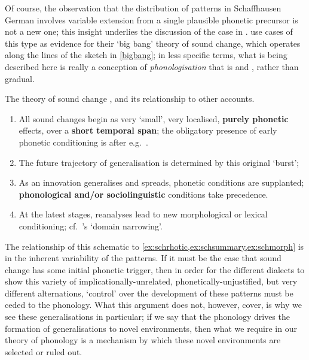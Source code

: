 Of course, the observation that the distribution of patterns in Schaffhausen German involves variable extension from a single plausible phonetic precursor is not a new one; this insight underlies the discussion of the case in \citet{JandaJoseph2003,Mielke2008}. \citeauthor{JandaJoseph2003} use cases of this type as evidence for their `big bang' theory of sound change, which operates along the lines of the sketch in \cref{bigbang}; in less specific terms, what is being described here is really a conception of \emph{phonologisation} that is  and , rather than gradual.

\begin{example}\label{bigbang} The  theory of sound change \citep{JandaJoseph2003}, and its relationship to other accounts.
\begin{enumerate}
\item All sound changes begin as very `small', very localised, \textbf{purely phonetic} effects, over a \textbf{short temporal span}; the obligatory presence of early phonetic conditioning is after e.g.~\citet{Ohala1981}.
\item The future trajectory of generalisation is determined by this original `burst';
\item As an innovation generalises and spreads, phonetic conditions are supplanted; \textbf{phonological and/or sociolinguistic} conditions take precedence.
\item At the latest stages, reanalyses lead to new morphological or lexical conditioning; cf.~\citet{BermudezOtero2007}'s `domain narrowing'.
\end{enumerate}
\end{example}

The relationship of this schematic to \cref{ex:schrhotic,ex:schsummary,ex:schmorph} is in the inherent variability of the patterns. If it must be the case that sound change has some initial phonetic trigger, then in order for the different dialects to show this variety of implicationally-unrelated, phonetically-unjustified, but very different alternations, `control' over the development of these patterns must be ceded to the phonology. What this argument does not, however, cover, is why we see these generalisations in particular; if we say that the phonology drives the formation of generalisations to novel environments, then what we require in our theory of phonology is a mechanism by which these novel environments are selected or ruled out.



